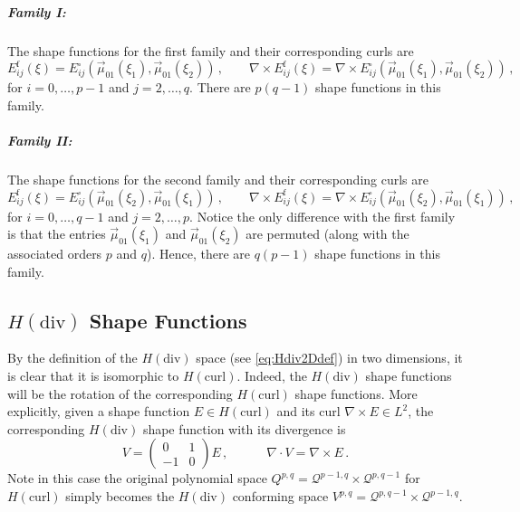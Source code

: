 \subparagraph{Family I:}
The shape functions for the first family and their corresponding curls are
\begin{equation}
    E_{ij}^{\mathrm{f}}(\xi)=E_{ij}^{\square}(\vec{\mu}_{01}(\xi_1),\vec{\mu}_{01}(\xi_2))\,,\qquad
    \nabla\times E_{ij}^{\mathrm{f}}(\xi)=\nabla\times E_{ij}^{\square}(\vec{\mu}_{01}(\xi_1),\vec{\mu}_{01}(\xi_2))\,,
\end{equation}
for $i=0,\ldots,p-1$ and $j=2,\ldots,q$.
There are $p(q-1)$ shape functions in this family.

\subparagraph{Family II:}
The shape functions for the second family and their corresponding curls are
\begin{equation}
    E_{ij}^{\mathrm{f}}(\xi)=E_{ij}^{\square}(\vec{\mu}_{01}(\xi_2),\vec{\mu}_{01}(\xi_1))\,,\qquad
    \nabla\times E_{ij}^{\mathrm{f}}(\xi)=\nabla\times E_{ij}^{\square}(\vec{\mu}_{01}(\xi_2),\vec{\mu}_{01}(\xi_1))\,,
\end{equation}
for $i=0,\ldots,q-1$ and $j=2,\ldots,p$. 
Notice the only difference with the first family is that the entries $\vec{\mu}_{01}(\xi_1)$ and $\vec{\mu}_{01}(\xi_2)$ are permuted (along with the associated orders $p$ and $q$).
Hence, there are $q(p-1)$ shape functions in this family.

\subsection{\texorpdfstring{$H(\mathrm{div})$}{Hdiv} Shape Functions}

By the definition of the $H(\mathrm{div})$ space (see \eqref{eq:Hdiv2Ddef}) in two dimensions, it is clear that it is isomorphic to $H(\mathrm{curl})$. 
Indeed, the $H(\mathrm{div})$ shape functions will be the rotation of the corresponding $H(\mathrm{curl})$ shape functions. 
More explicitly, given a shape function $E\in H(\mathrm{curl})$ and its curl $\nabla\times E\in L^2$, the corresponding $H(\mathrm{div})$ shape function with its divergence is
\begin{equation}
    V=\begin{pmatrix}0&1\\-1&0\end{pmatrix}E\,,\quad\qquad\nabla\cdot V=\nabla\times E\,.
\end{equation}
Note in this case the original polynomial space $Q^{p,q}=\mathcal{Q}^{p-1,q}\times\mathcal{Q}^{p,q-1}$ for $H(\mathrm{curl})$ simply becomes the $H(\mathrm{div})$ conforming space $V^{p,q}=\mathcal{Q}^{p,q-1}\times\mathcal{Q}^{p-1,q}$.


